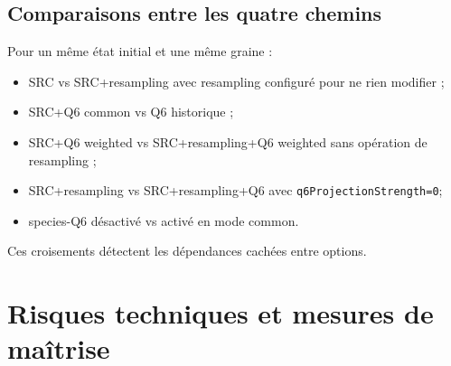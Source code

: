 \documentclass[11pt,a4paper]{article}
\newcommand{\code}[1]{\texttt{#1}}
\begin{document}
\subsection{Comparaisons entre les quatre chemins}

Pour un même état initial et une même graine :
\begin{itemize}
  \item SRC vs SRC+resampling avec resampling configuré pour ne rien modifier ;
  \item SRC+Q6 common vs Q6 historique ;
  \item SRC+Q6 weighted vs SRC+resampling+Q6 weighted sans opération de resampling ;
  \item SRC+resampling vs SRC+resampling+Q6 avec \code{q6ProjectionStrength=0};
  \item species-Q6 désactivé vs activé en mode common.
\end{itemize}

Ces croisements détectent les dépendances cachées entre options.

\section{Risques techniques et mesures de maîtrise}
\end{document}
